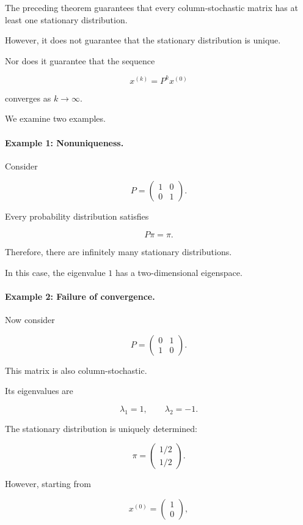 \documentclass[11pt,a4paper]{article}
\theoremstyle{definition}
\theoremstyle{remark}
\begin{document}
The preceding theorem
guarantees that every
column-stochastic matrix
has at least one stationary
distribution.

However, it does not
guarantee that the stationary
distribution is unique.

Nor does it guarantee
that the sequence

\[
x^{(k)}=P^kx^{(0)}
\]

converges as $k\to\infty$.

We examine two examples.

\paragraph{Example 1: Nonuniqueness.}

Consider

\[
P=
\begin{pmatrix}
1&0\\
0&1
\end{pmatrix}.
\]

Every probability distribution
satisfies

\[
P\pi=\pi.
\]

Therefore, there are
infinitely many stationary
distributions.

In this case, the
eigenvalue $1$ has
a two-dimensional eigenspace.

\paragraph{Example 2: Failure of convergence.}

Now consider

\[
P=
\begin{pmatrix}
0&1\\
1&0
\end{pmatrix}.
\]

This matrix is also
column-stochastic.

Its eigenvalues are

\[
\lambda_1=1,
\qquad
\lambda_2=-1.
\]

The stationary distribution
is uniquely determined:

\[
\pi=
\begin{pmatrix}
1/2\\
1/2
\end{pmatrix}.
\]

However, starting from

\[
x^{(0)}
=
\begin{pmatrix}
1\\
0
\end{pmatrix},
\]
\end{document}

